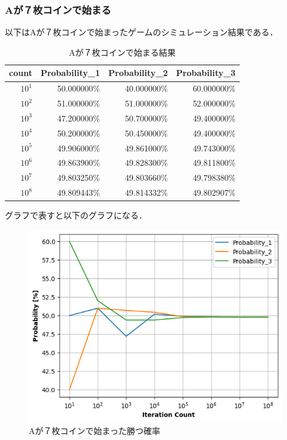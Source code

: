 \documentclass[a4j, titlepage]{jarticle}
\begin{document}
      \subsubsection{Aが７枚コインで始まる}
        以下はAが７枚コインで始まったゲームのシミュレーション結果である．

        \begin{longtable}[c]{|r|r|r|r|}
          \caption{Aが７枚コインで始まる結果}
          \label{tab:coin7}\\
          \hline
          \rowcolor[HTML]{C0C0C0} 
          count    & Probability\_1 & Probability\_2 & Probability\_3 \\ \hline
          \endfirsthead
          \endhead
          $10^1$   & 50.000000\%      & 40.000000\%      & 60.000000\%      \\ \hline
          $10^2$   & 51.000000\%      & 51.000000\%      & 52.000000\%      \\ \hline
          $10^3$   & 47.200000\%      & 50.700000\%      & 49.400000\%      \\ \hline
          $10^4$   & 50.200000\%      & 50.450000\%      & 49.400000\%      \\ \hline
          $10^5$   & 49.906000\%      & 49.861000\%      & 49.743000\%      \\ \hline
          $10^6$   & 49.863900\%      & 49.828300\%      & 49.811800\%      \\ \hline
          $10^7$   & 49.803250\%      & 49.803660\%      & 49.798380\%      \\ \hline
          $10^8$   & 49.809443\%      & 49.814332\%      & 49.802907\%      \\ \hline
        \end{longtable}
        \clearpage

        グラフで表すと以下のグラフになる．
        \begin{figure}[htb]
          \begin{center}
            \includegraphics[scale=0.55]{../Dir_Coin/img_coin7.png}
            \caption{Aが７枚コインで始まった勝つ確率}
            \label{img:coin7}
          \end{center}
        \end{figure}
      
\end{document}
